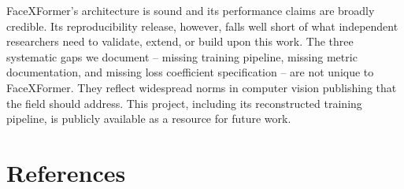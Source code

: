 \documentclass[11pt]{article}
\begin{document}
FaceXFormer's architecture is sound and its performance claims are broadly credible. Its reproducibility release, however, falls well short of what independent researchers need to validate, extend, or build upon this work. The three systematic gaps we document -- missing training pipeline, missing metric documentation, and missing loss coefficient specification -- are not unique to FaceXFormer. They reflect widespread norms in computer vision publishing that the field should address. This project, including its reconstructed training pipeline, is publicly available as a resource for future work.



\section*{References}
\end{document}
